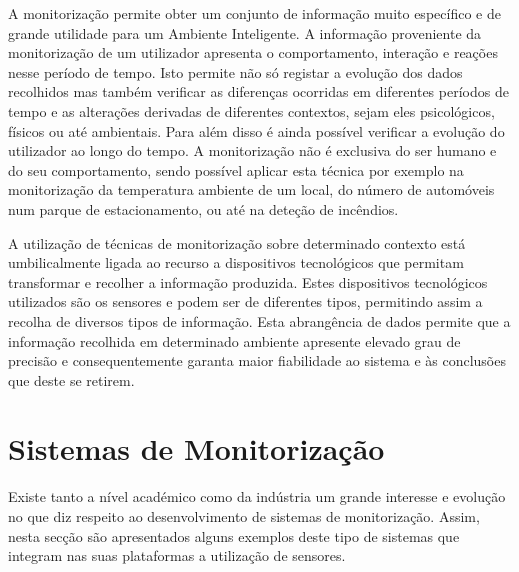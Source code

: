 A monitorização permite obter um conjunto de informação muito específico e de grande utilidade para um Ambiente Inteligente. A informação proveniente da monitorização de um utilizador apresenta o comportamento, interação e reações nesse período de tempo. Isto permite não só registar a evolução dos dados recolhidos mas também verificar as diferenças ocorridas em diferentes períodos de tempo e as alterações derivadas de diferentes contextos, sejam eles psicológicos, físicos ou até ambientais. Para além disso é ainda possível verificar a evolução do utilizador ao longo do tempo. A monitorização não é exclusiva do ser humano e do seu comportamento, sendo possível aplicar esta técnica por exemplo na monitorização da temperatura ambiente de um local, do número de automóveis num parque de estacionamento, ou até na deteção de incêndios.

A utilização de técnicas de monitorização sobre determinado contexto está umbilicalmente ligada ao recurso a dispositivos tecnológicos que permitam transformar e recolher a informação produzida. Estes dispositivos tecnológicos utilizados são os sensores e podem ser de diferentes tipos, permitindo assim a recolha de diversos tipos de informação. Esta abrangência de dados permite que a informação recolhida em determinado ambiente apresente elevado grau de precisão e consequentemente garanta maior fiabilidade ao sistema e às conclusões que deste se retirem.


\section{Sistemas de Monitorização}

Existe tanto a nível académico como da indústria um grande interesse e evolução no que diz respeito ao desenvolvimento de sistemas de monitorização. Assim, nesta secção são apresentados alguns exemplos deste tipo de sistemas que integram nas suas plataformas a utilização de sensores. 

